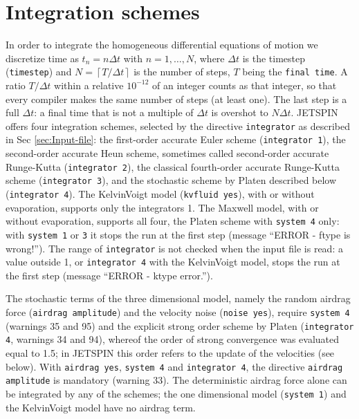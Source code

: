 \section{Integration schemes\label{sec:Integration-schemes}}

In order to integrate the homogeneous differential equations of motion
we discretize time as $t_{n}=n\Delta t$ with $n=1,\ldots,N$, where
$\Delta t$ is the timestep (\texttt{timestep}) and $N=\left\lceil T/\Delta t\right\rceil $
is the number of steps, $T$ being the \texttt{final time}. A ratio
$T/\Delta t$ within a relative $10^{-12}$ of an integer counts as that
integer, so that every compiler makes the same number of steps (at
least one). The last step is a full $\Delta t$: a final time that is
not a multiple of $\Delta t$ is overshot to $N\Delta t$. JETSPIN offers
four integration schemes, selected by the directive \texttt{integrator}
as described in Sec \ref{sec:Input-file}: the first-order accurate Euler
scheme (\texttt{integrator 1}), the second-order accurate Heun scheme,
sometimes called second-order accurate Runge-Kutta (\texttt{integrator 2}),
the classical fourth-order accurate Runge-Kutta scheme\cite{press2007numerical}
(\texttt{integrator 3}), and the stochastic scheme by Platen described
below (\texttt{integrator 4}). The Kelvin\textendash Voigt model
(\texttt{kvfluid yes}), with or without evaporation, supports only the
integrators 1. The Maxwell model, with or without evaporation,
supports all four, the Platen scheme with \texttt{system 4} only: with
\texttt{system 1} or \texttt{3} it stops the run at the first step
(message ``ERROR - ftype is wrong!''). The range of \texttt{integrator}
is not checked when the input file is read: a value outside 1,
or \texttt{integrator 4} with the Kelvin\textendash Voigt model, stops
the run at the first step (message ``ERROR - ktype error.'').

The stochastic terms of the three dimensional model, namely the random
airdrag force (\texttt{airdrag amplitude}) and the
velocity noise (\texttt{noise yes}), require \texttt{system 4} (warnings
35 and 95) and the explicit strong order scheme by Platen
\cite{platen1987derivative,kloeden1992numerical,platen2010numerical}
(\texttt{integrator 4}, warnings 34 and 94), whereof the order of strong
convergence was evaluated equal to 1.5; in JETSPIN this order refers to
the update of the velocities (see below). With \texttt{airdrag yes},
\texttt{system 4} and \texttt{integrator 4}, the directive \texttt{airdrag
amplitude} is mandatory (warning 33). The deterministic airdrag force
alone can be integrated by any of the schemes; the one dimensional model
(\texttt{system 1}) and the Kelvin\textendash Voigt model have no airdrag
term.

